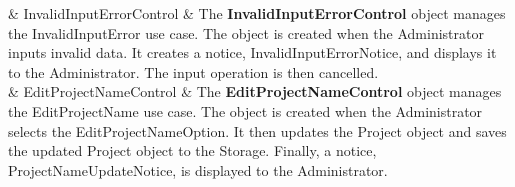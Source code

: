 \documentclass[12pt,letterpaper]{article}
\begin{document}
\begin{center}
\begin{tabu}
		 & Invalid\-Input\-Error\-Control & 
			The {\bf InvalidInputErrorControl} object manages the InvalidInputError use case. The object is created when the Administrator inputs invalid data. It creates a notice, 
			InvalidInputErrorNotice, and displays it to the Administrator. The input operation is then cancelled.\\

		 & Edit\-Project\-Name\-Control & 
			The {\bf EditProjectNameControl} object manages the EditProjectName use case. The object is created when the Administrator selects the EditProjectNameOption.
			It then updates the Project object and saves the updated Project object to the Storage. Finally, a notice, ProjectNameUpdateNotice, is displayed to the Administrator.\\
\end{tabu}
\end{center}
\end{document}
